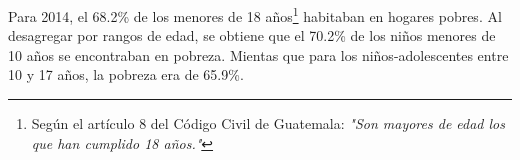 Para 2014, el 68.2\% de los menores de 18 años\footnote{Según el artículo 8 del Código Civil de Guatemala: \textit{"Son mayores de edad los que han cumplido 18 años."}} habitaban en hogares pobres. Al desagregar por rangos de edad, se obtiene que el 70.2\% de los niños menores de 10 años se encontraban en pobreza. Mientas que para los niños-adolescentes entre 10 y 17 años, la pobreza era de 65.9\%.